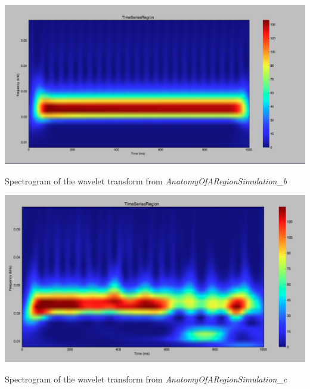 \documentclass{tufte-handout}
\begin{document}
\begin{marginfigure}%
\includegraphics[width=\linewidth]{Handout_UI_BuildingYourOwnBrainNetworkModel_WaveletDeterministic}%
  \caption{Spectrogram of the wavelet transform from \textit{AnatomyOfARegionSimulation\_b}}%
  \label{fig:wavelet_deteministic}%
\end{marginfigure}
%
\begin{marginfigure}%
\includegraphics[width=\linewidth]{Handout_UI_BuildingYourOwnBrainNetworkModel_WaveletStochastic}%
  \caption{Spectrogram of the wavelet transform from \textit{AnatomyOfARegionSimulation\_c}}%
  \label{fig:wavelet_stochastic}%
\end{marginfigure}
\end{document}
